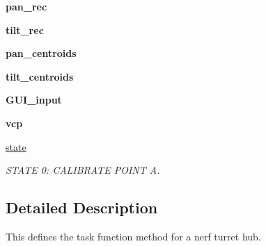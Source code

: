 \begin{DoxyCompactItemize}
\item 
{\bfseries pan\+\_\+rec}\hypertarget{classturret__hub__task__func_1_1Turret__Hub__Task_adfb357201a446191017506d326b90ccd}{}\label{classturret__hub__task__func_1_1Turret__Hub__Task_adfb357201a446191017506d326b90ccd}

\item 
{\bfseries tilt\+\_\+rec}\hypertarget{classturret__hub__task__func_1_1Turret__Hub__Task_a74a0e26bee095a8e6caff8d95f473ecc}{}\label{classturret__hub__task__func_1_1Turret__Hub__Task_a74a0e26bee095a8e6caff8d95f473ecc}

\item 
{\bfseries pan\+\_\+centroids}\hypertarget{classturret__hub__task__func_1_1Turret__Hub__Task_ad4b8bdf1413d9b718ad487873131461e}{}\label{classturret__hub__task__func_1_1Turret__Hub__Task_ad4b8bdf1413d9b718ad487873131461e}

\item 
{\bfseries tilt\+\_\+centroids}\hypertarget{classturret__hub__task__func_1_1Turret__Hub__Task_a8ba64ab332d687aa0771ca31bf729213}{}\label{classturret__hub__task__func_1_1Turret__Hub__Task_a8ba64ab332d687aa0771ca31bf729213}

\item 
{\bfseries G\+U\+I\+\_\+input}\hypertarget{classturret__hub__task__func_1_1Turret__Hub__Task_abda7ce4b19f9f1b6ab4dcdb98f557331}{}\label{classturret__hub__task__func_1_1Turret__Hub__Task_abda7ce4b19f9f1b6ab4dcdb98f557331}

\item 
{\bfseries vcp}\hypertarget{classturret__hub__task__func_1_1Turret__Hub__Task_a5419f82374a7bfba4c9079cdec5f5289}{}\label{classturret__hub__task__func_1_1Turret__Hub__Task_a5419f82374a7bfba4c9079cdec5f5289}

\item 
\hyperlink{classturret__hub__task__func_1_1Turret__Hub__Task_a259370821a4dcfed2621debae7558850}{state}
\begin{DoxyCompactList}\small\item\em S\+T\+A\+TE 0\+: C\+A\+L\+I\+B\+R\+A\+TE P\+O\+I\+NT A. \end{DoxyCompactList}\end{DoxyCompactItemize}


\subsection{Detailed Description}
This defines the task function method for a nerf turret hub. 

